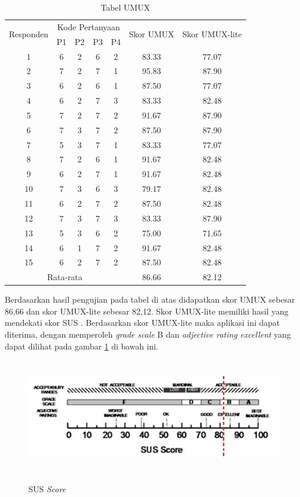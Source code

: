 \begin{table}[H]
	\begin{center}
	\caption{Tabel UMUX}
	\label{tab:UMUX}
	\begin{tabular}{|c|c|c|c|c|c|c|}
	\hline
	\multirow{2}{*}{Responden}&\multicolumn{4}{c|}{Kode Pertanyaan}&\multirow{2}{*}{Skor UMUX}&\multirow{2}{*}{Skor UMUX-lite}\\
	\cline{2-5}
	&P1&P2&P3&P4&&\\
	\hline
	1&6&2&6&2&83.33&77.07\\
	\hline
	2&7&2&7&1&95.83&87.90\\
	\hline
	3&6&2&6&1&87.50&77.07\\
	\hline
	4&6&2&7&3&83.33&82.48\\
	\hline
	5&7&2&7&2&91.67&87.90\\
	\hline
	6&7&3&7&2&87.50&87.90\\
	\hline
	7&5&3&7&1&83.33&77.07\\
	\hline
	8&7&2&6&1&91.67&82.48\\
	\hline
	9&6&2&7&1&91.67&82.48\\
	\hline
	10&7&3&6&3&79.17&82.48\\
	\hline
	11&6&2&7&2&87.50&82.48\\
	\hline
	12&7&3&7&3&83.33&87.90\\
	\hline
	13&5&3&6&2&75.00&71.65\\
	\hline
	14&6&1&7&2&91.67&82.48\\
	\hline
	15&6&2&7&2&87.50&82.48\\
	\hline
	\multicolumn{5}{|c|}{Rata-rata}&86.66&82.12\\
	\hline
	\end{tabular}
	\end{center}
\end{table}

\par Berdasarkan hasil pengujian pada tabel di atas didapatkan skor UMUX sebesar 86,66 dan skor UMUX-lite sebesar 82,12. Skor UMUX-lite memiliki hasil yang mendekati skor SUS \citep{article}. Berdasarkan skor UMUX-lite maka aplikasi ini dapat diterima, dengan memperoleh \textit{grade scale} B dan \textit{adjective rating excellent} yang dapat dilihat pada gambar \ref*{umux-lite} di bawah ini.

\begin{figure}[H]
	\centering
	{\includegraphics [width = 13cm, height= 5cm]{gambar/umux-lite}}
	\caption{SUS \textit{Score}}
	\label{umux-lite}
\end{figure}

